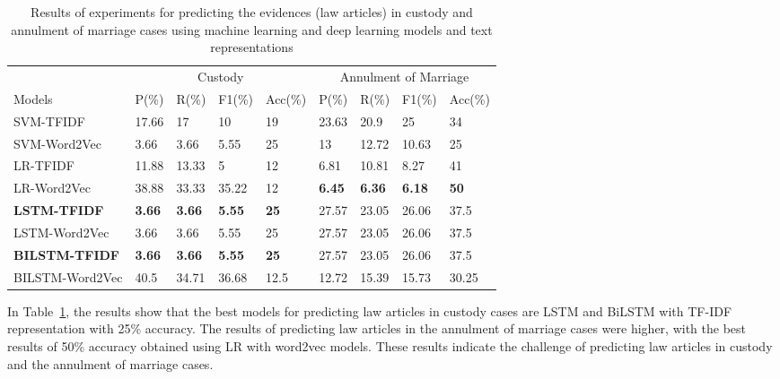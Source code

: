 \documentclass[sn-mathphys,Numbered]{sn-jnl}%
\theoremstyle{thmstyleone}%
\theoremstyle{thmstyletwo}%
\theoremstyle{thmstylethree}%
\begin{document}
\begin{table}[h]
\begin{tabular}{|l|l|l|l|l|l|l|l|l|}
\hline
    & \multicolumn{4}{c|}{Custody}   & \multicolumn{4}{c|}{Annulment of Marriage}  \\
         \hhline{~|--------}

Models   & P(\%) & R(\%) & F1(\%) & Acc(\%) & P(\%) & R(\%) & F1(\%) & Acc(\%)    \\ \hline
    SVM-TFIDF & 17.66 & 17 & 10 & 19 & 23.63 & 20.9 & 25 & 34 \\ \hline
        SVM-Word2Vec & 3.66 & 3.66 & 5.55 & 25 & 13 & 12.72 & 10.63 & 25 \\ \hline
        LR-TFIDF & 11.88 & 13.33 & 5 & 12 & 6.81 & 10.81 & 8.27 & 41 \\ \hline
        LR-Word2Vec & 38.88 & 33.33 & 35.22 & 12  & \textbf{6.45 } & \textbf{6.36 } & \textbf{6.18 } & \textbf{50} \\ \hline
        \textbf{LSTM-TFIDF} & \textbf{3.66 } & \textbf{3.66 } & \textbf{5.55 } & \textbf{25 } & 27.57 & 23.05 & 26.06 & 37.5 \\ \hline
        LSTM-Word2Vec & 3.66 & 3.66 & 5.55 & 25 & 27.57 & 23.05 & 26.06 & 37.5 \\ \hline
        \textbf{BILSTM-TFIDF} & \textbf{3.66 } & \textbf{3.66 } & \textbf{5.55 } & \textbf{25 } & 27.57 & 23.05 & 26.06 & 37.5 \\ \hline
        BILSTM-Word2Vec & 40.5 & 34.71 & 36.68 & 12.5 & 12.72 & 15.39 & 15.73 & 30.25 \\ \hline                 
\end{tabular}

\caption{Results of experiments for predicting the evidences (law articles) in custody and annulment of marriage cases using machine learning and deep learning models and text representations}
\label{Results of experiments for predicting the evidences in custody and annulment of marriage cases}
\end{table}

In Table~\ref{Results of experiments for predicting the evidences in custody and annulment of marriage cases}, the results show that the best models for predicting law articles in custody cases are LSTM and BiLSTM with TF-IDF representation with 25\% accuracy. The results of predicting law articles in the annulment of marriage cases were higher, with the best results of 50\% accuracy obtained using LR with word2vec models. These results indicate the challenge of predicting law articles in custody and the annulment of marriage cases. 
\end{document}
